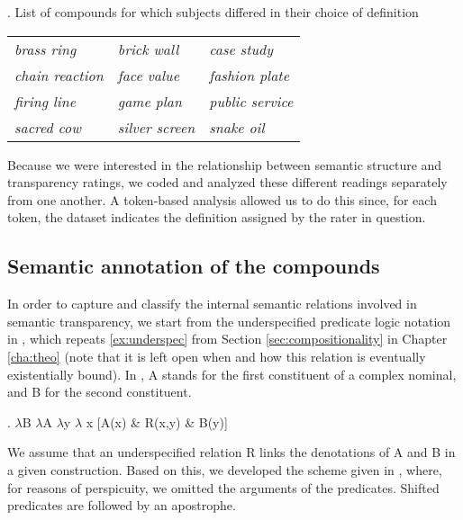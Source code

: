 \ex. List of compounds for which subjects differed in their choice of definition\\
\begin{tabular}{lll}
\emph{brass ring}&\emph{brick wall}&\emph{case study}\\
\emph{chain reaction}&\emph{face value}&\emph{fashion plate}\\
\emph{firing line}&\emph{game plan}&\emph{public service}\\
\emph{sacred cow}&\emph{silver screen}&\emph{snake oil}\\
\end{tabular}

Because we were interested in the relationship
between semantic structure
and transparency ratings, we coded
and analyzed these different readings separately from one another. A
token-based analysis allowed us to do this since, for each token, the
dataset indicates the definition assigned by the rater in question. 


\subsection{Semantic annotation of the compounds}
\label{sec:bell-schaefer-sem-annotation}

In order to capture and classify the internal semantic relations involved in
semantic transparency, we start from the underspecified predicate
logic notation in \Next, which repeats \ref{ex:underspec} from Section
\ref{sec:compositionality} in Chapter \ref{cha:theo} (note that it is left open when and how this relation is eventually existentially bound). In \Next, A stands for the first  constituent of a complex
nominal, and B for the second constituent. 

\ex. \label{ex:underspecified}
$\lambda$B $\lambda$A $\lambda$y $\lambda$ x [A(x) \& R(x,y)
\& B(y)]

We assume that an underspecified relation R links the denotations of A
and B in a given construction.
Based on this, we developed the scheme given in , where, for reasons
of perspicuity, we omitted the arguments of the predicates. Shifted
predicates are followed by an apostrophe.



